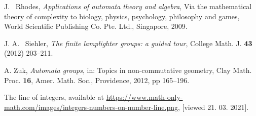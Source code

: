 \documentclass[mat1]{fmfdeloTS2.0}
\begin{document}
\begin{thebibliography}{99}
 J. ~Rhodes, \emph{Applications of automata theory and algebra}, Via the mathematical theory of complexity to biology, physics, psychology, philosophy and games, World Scientific Publishing Co. Pte. Ltd., Singapore, 2009.

 J. A. ~Siehler, \emph{The finite lamplighter groups: a guided tour}, College Math. J. \textbf{43} (2012) 203--211.

 A. Zuk, \textit{Automata groups}, in: Topics in non-commutative geometry, Clay Math. Proc. \textbf{16}, Amer. Math. Soc., Providence, 2012, pp 165--196.

 The line of integers, available at \url{https://www.math-only-math.com/images/integers-numbers-on-number-line.png}, [viewed 21. 03. 2021].

\end{thebibliography}
\end{document}
